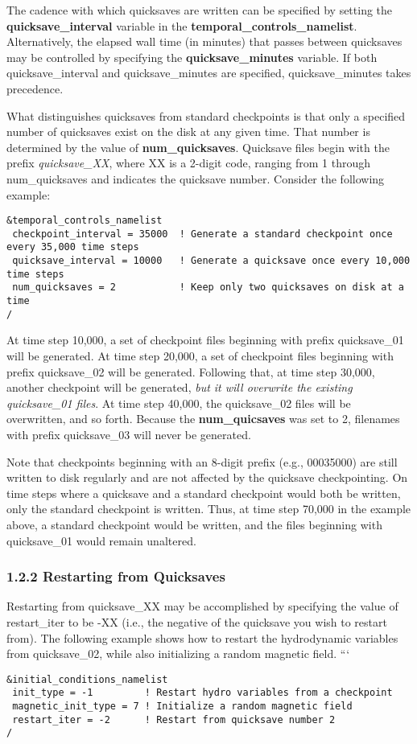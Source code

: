 The cadence with which quicksaves are written can be specified by setting the \textbf{quicksave\_interval} variable in the \textbf{temporal\_controls\_namelist}.  Alternatively, the elapsed wall time (in minutes) that passes between quicksaves may be controlled by specifying the \textbf{quicksave\_minutes} variable.  If both quicksave\_interval and quicksave\_minutes are specified, quicksave\_minutes takes precedence.

What distinguishes quicksaves from standard checkpoints is that only a specified number of quicksaves exist on the disk at any given time.  That number is determined by the value of \textbf{num\_quicksaves}.  Quicksave files begin with the prefix \textit{quicksave\_XX}, where XX is a 2-digit code, ranging from 1 through num\_quicksaves and indicates the quicksave number.  Consider the following example:
\begin{lstlisting}
&temporal_controls_namelist
 checkpoint_interval = 35000  ! Generate a standard checkpoint once every 35,000 time steps
 quicksave_interval = 10000   ! Generate a quicksave once every 10,000 time steps
 num_quicksaves = 2           ! Keep only two quicksaves on disk at a time
/
\end{lstlisting}
At time step 10,000, a set of checkpoint files beginning with prefix quicksave\_01 will be generated.  At time step 20,000, a set of checkpoint files beginning with prefix quicksave\_02 will be generated.  Following that, at time step 30,000, another checkpoint will be generated, \textit{but it will overwrite the existing quicksave\_01 files}.  At time step 40,000, the quicksave\_02 files will be overwritten, and so forth.  Because the \textbf{num\_quicsaves} was set to 2, filenames with prefix quicksave\_03 will never be generated.

Note that checkpoints beginning with an 8-digit prefix (e.g., 00035000) are still written to disk regularly and are not affected by the quicksave checkpointing.  On time steps where  a quicksave and a standard checkpoint would both be written, only the standard checkpoint is written.  Thus, at time step 70,000 in the example above, a standard checkpoint would be written, and the files beginning with quicksave\_01 would remain unaltered.

\subsubsection{1.2.2 Restarting from Quicksaves}
Restarting from quicksave\_XX may be accomplished by specifying the value of restart\_iter to be -XX (i.e., the negative of the quicksave you wish to restart from).  The following example shows how to restart the hydrodynamic variables from quicksave\_02, while also initializing a random magnetic field.
```
\begin{lstlisting}
&initial_conditions_namelist
 init_type = -1         ! Restart hydro variables from a checkpoint
 magnetic_init_type = 7 ! Initialize a random magnetic field
 restart_iter = -2      ! Restart from quicksave number 2
/
\end{lstlisting}

